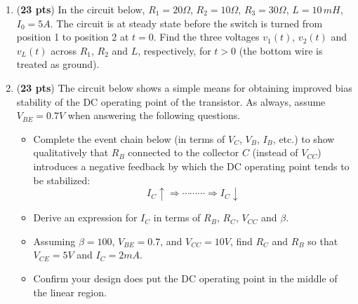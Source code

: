 \begin{enumerate}
\begin{itemize}
  \end{itemize}

\item ({\bf 23 pts})
  In the circuit below, $R_1=20\Omega$, $R_2=10\Omega$, $R_3=30\Omega$,
  $L=10\,mH$, $I_0=5A$. The circuit is at steady state before the switch is 
  turned from position 1 to position 2 at $t=0$. Find the three voltages 
  $v_1(t)$, $v_2(t)$ and $v_L(t)$ across $R_1$, $R_2$ and $L$, respectively,
  for $t>0$ (the bottom wire is treated as ground).
  

  \begin{comment}

  {\bf Solution:} $\tau=L/(R_2+R_3)=10^{-2}/40=2.5\times 10^{-4}\,s$
  \[
  i_L(0^-)=i_L(0^+)=I_0\frac{R_1}{R_1+R_3}=5A\frac{20}{50}=2A,\;\;\;\;\;
  i_L(\infty)=0,\;\;\;\;\;i_L(t)=2\,e^{-t/\tau}
  \]
  \[ 
  v_1(t)=5A,\;\;\;\; v_2(t)=R_2 i_L(t)=20\,e^{-t/\tau},\;\;\;\;\;
  v_3(t)=R_3 i_L(t)=30\,e^{-t/\tau}
  \]
  \end{comment}


\item ({\bf 23 pts})
  The circuit below shows a simple means for obtaining improved bias
  stability of the DC operating point of the transistor. As always,
  assume $V_{BE}=0.7V$ when answering the following questions.


  \begin{itemize}
  \item Complete the event chain below (in terms of $V_C$, $V_B$, $I_B$,
    etc.) to show qualitatively that $R_B$ connected to the collector $C$ 
    (instead of $V_{CC}$) introduces a negative feedback by which the DC
    operating point tends to be stabilized:
    \[
    I_C \uparrow \Longrightarrow \cdots\cdots\cdots \Longrightarrow I_C \downarrow     
    \]
  \item Derive an expression for $I_C$ in terms of $R_B$, $R_C$, $V_{CC}$ 
    and $\beta$.
  \item Assuming $\beta=100$, $V_{BE}=0.7$, and $V_{CC}=10V$, find $R_C$ 
    and $R_B$ so that $V_{CE}=5V$ and $I_C=2mA$.
  \item Confirm your design does put the DC operating point in the middle
    of the linear region.
  \end{itemize}


  \begin{comment}


\end{comment}
\end{enumerate}
